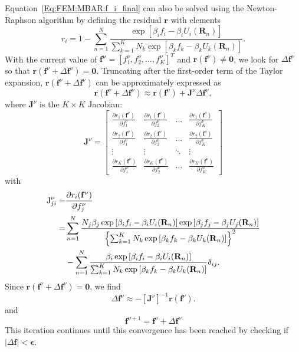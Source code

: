 Equation~\ref{Eq:FEM:MBAR:f_i_final} can also be solved using the Newton-Raphson algorithm by defining the residual $\mathbf{r}$ with elements
\begin{equation}
    r_i=1-\sum_{n=1}^{N}\frac{\exp{\left[\beta_i f_i-\beta_i U_i(\mathbf{R}_n)\right]}}{\sum_{k=1}^{K}N_k\exp{\left[\beta_kf_k-\beta_kU_k(\mathbf{R}_n)\right]}}.
\end{equation}
With the current value of $\mathbf{f^\nu}=[f_1^\nu,f_2^\nu,\dots,f_K^\nu]^T$ and $\mathbf{r}(\mathbf{f}^\nu)\neq \mathbf{0}$, we look for $\Delta \mathbf{f}^\nu$ so that $\mathbf{r}(\mathbf{f}^\nu+\Delta \mathbf{f}^\nu)=\mathbf{0}$. Truncating after the first-order term of the Taylor expansion, $\mathbf{r}(\mathbf{f}^\nu+\Delta \mathbf{f}^\nu)$ can be approximately expressed as
\begin{equation}
    \mathbf{r}(\mathbf{f}^\nu+\Delta \mathbf{f}^\nu)\approx \mathbf{r}(\mathbf{f}^\nu) + \mathbf{J}^\nu\Delta \mathbf{f}^\nu,
\end{equation}
where $\mathbf{J}^\nu$ is the $K\times K$ Jacobian:
\begin{equation}
    \mathbf{J}^\nu=\begin{bmatrix}
        \frac{\partial r_1(\mathbf{f}^\nu)}{\partial f_1^\nu}&\frac{\partial r_1(\mathbf{f}^\nu)}{\partial f_2^\nu}&\dots& \frac{\partial r_1(\mathbf{f}^\nu)}{\partial f_K^\nu}\\
        \frac{\partial r_2(\mathbf{f}^\nu)}{\partial f_1^\nu}&\frac{\partial r_2(\mathbf{f}^\nu)}{\partial f_2^\nu}&\dots& \frac{\partial r_2(\mathbf{f}^\nu)}{\partial f_K^\nu}\\
        \vdots&\vdots&\ddots&\vdots\\
        \frac{\partial r_K(\mathbf{f}^\nu)}{\partial f_1^\nu}&\frac{\partial r_K(\mathbf{f}^\nu)}{\partial f_2^\nu}&\dots& \frac{\partial r_K(\mathbf{f}^\nu)}{\partial f_K^\nu}
    \end{bmatrix}
\end{equation}
with
\begin{align}
	\mathrm{J}^\nu_{ji}=&\frac{\partial r_i(\mathbf{f}^\nu)}{\partial f_j^\nu}\notag\\
	                   =&\sum_{n=1}^N\frac{N_j\beta_j\exp{\left[\beta_i f_i-\beta_i U_i(\mathbf{R}_n)\right]}\exp{\left[\beta_j f_j-\beta_j U_j(\mathbf{R}_n)\right]}}{\left\{\sum_{k=1}^K N_k\exp{\left[\beta_kf_k-\beta_kU_k(\mathbf{R}_n)\right]}\right\}^2}\notag\\
	                    &-\sum_{n=1}^N\frac{\beta_i\exp{\left[\beta_i f_i-\beta_i U_i(\mathbf{R}_n)\right]}}{\sum_{k=1}^K N_k\exp{\left[\beta_kf_k-\beta_kU_k(\mathbf{R}_n)\right]}}\delta_{ij}.
\end{align}
Since $\mathbf{r}(\mathbf{f}^\nu+\Delta \mathbf{f}^\nu)=\mathbf{0}$, we find
\begin{equation}
    \Delta \mathbf{f}^\nu\approx -\left[\mathbf{J}^\nu\right]^{-1}\mathbf{r}(\mathbf{f}^\nu).
\end{equation}
and
\begin{equation}
    \mathbf{f}^{\nu+1}=\mathbf{f}^\nu+\Delta \mathbf{f}^\nu
\end{equation}
This iteration continues until this convergence has been reached by checking if $|\Delta \mathbf{f}|<\boldsymbol{\epsilon}$.


